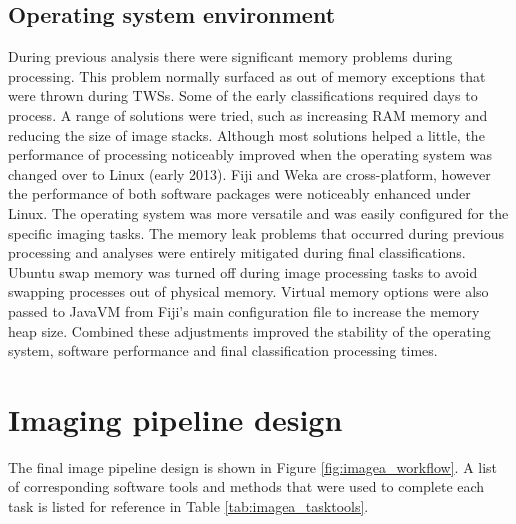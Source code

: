 \subsection{Operating system environment}
During previous analysis there were significant memory problems during processing. This problem normally surfaced as out of memory exceptions that were thrown during \acp{TWS}. Some of the early classifications required days to process. A range of solutions were tried, such as increasing RAM memory and reducing the size of image stacks. Although most solutions helped a little, the performance of processing noticeably improved when the operating system was changed over to Linux (early 2013). \ac{Fiji} and \ac{Weka} are cross-platform, however the performance of both software packages were noticeably enhanced under Linux. The operating system was more versatile and was easily configured for the specific imaging tasks. The memory leak problems that occurred during previous processing and analyses were entirely mitigated during final classifications. Ubuntu swap memory was turned off during image processing tasks to avoid swapping processes out of physical memory. Virtual memory options were also passed to JavaVM from Fiji's main configuration file to increase the memory heap size. Combined these adjustments improved the stability of the operating system, software performance and final classification processing times.

\section{Imaging pipeline design}
The final image pipeline design is shown in Figure \ref{fig:imagea_workflow}. A list of corresponding software tools and methods that were used to complete each task is listed for reference in Table \ref{tab:imagea_tasktools}. 

